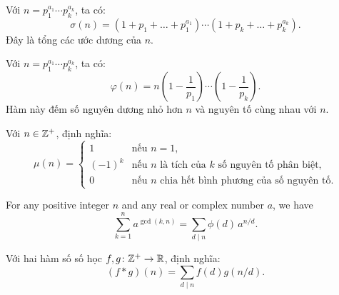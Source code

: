 \documentclass[../imo-training-open-book.tex]{subfiles}
\begin{document}
\vspace{1em}

\begin{definition}
    \label{definition:sigma-function}
    Với \( n = p_1^{a_1} \cdots p_k^{a_k} \), ta có:
    \[
        \sigma(n) = \left(1 + p_1 + \dots + p_1^{a_1}\right) \cdots \left(1 + p_k + \dots + p_k^{a_k}\right).
    \]
    Đây là tổng các ước dương của \( n \).
\end{definition}

\vspace{1em}

\begin{definition}
    \label{definition:euler-totient}
    Với \( n = p_1^{a_1} \cdots p_k^{a_k} \), ta có:
    \[
        \varphi(n) = n\left(1 - \frac{1}{p_1}\right) \cdots \left(1 - \frac{1}{p_k}\right).
    \]
    Hàm này đếm số nguyên dương nhỏ hơn \( n \) và nguyên tố cùng nhau với \( n \).
\end{definition}

\vspace{1em}

\begin{definition}
    \label{definition:mobius-function}
    Với \( n \in \mathbb Z^+ \), định nghĩa:
    \[
        \mu(n) =
        \begin{cases}
            1 & \text{nếu } n = 1, \\
            (-1)^k & \text{nếu } n \text{ là tích của } k \text{ số nguyên tố phân biệt}, \\
            0 & \text{nếu } n \text{ chia hết bình phương của số nguyên tố}.
        \end{cases}
    \]
\end{definition}

\vspace{1em}

\begin{theorem}
    \label{theorem:gcd-power-sum}
    For any positive integer \( n \) and any real or complex number \( a \), we have
    \[
        \sum_{k=1}^n a^{\gcd(k,n)} = \sum_{d \mid n} \phi(d) \, a^{n/d}.
    \]
\end{theorem}

\vspace{1em}

\begin{definition}
    \label{definition:dirichlet-convolution}
    Với hai hàm số số học \( f, g \colon \mathbb Z^+ \to \mathbb R \), định nghĩa:
    \[
        (f * g)(n) = \sum_{d \mid n} f(d) g(n/d).
    \]
\end{definition}
\end{document}
